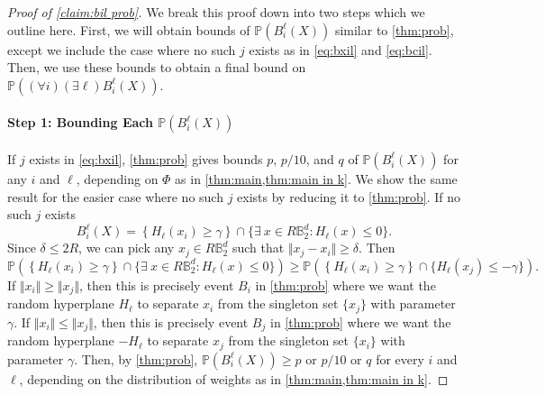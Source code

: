 \documentclass[aoap]{imsart}
\numberwithin{equation}{section}
\theoremstyle{definition}
\theoremstyle{remark}
\numberwithin{equation}{section}
\newcommand{\0}{\mathbf{0}}
\newcommand{\1}{\mathbf{1}}
\renewcommand{\P}{\mathbb{P}}
\newcommand{\B}{\mathbb{B}}
\numberwithin{equation}{section}
\begin{document}
\begin{proof}[Proof of \cref{claim:bil prob}]
We break this proof down into two steps which we outline here. First, we will obtain bounds of $\P(B_i^\ell(X))$ similar to \cref{thm:prob}, except we include the case where no such $j$ exists as in \eqref{eq:bxil} and \eqref{eq:bcil}. Then, we use these bounds to obtain a final bound on $\P\left((\forall i)(\exists \ell)B_{i}^{\ell}(X)\right)$. 

\paragraph{Step 1: Bounding Each $\P(B_i^\ell(X))$}
If $j$ exists in \eqref{eq:bxil}, \cref{thm:prob} gives bounds $p$, $p/10$, and $q$ of $\P(B_i^\ell(X))$ for any $i$ and $\ell$, depending on $\Phi$ as in \cref{thm:main,thm:main in k}. We show the same result for the easier case where no such $j$ exists by reducing it to \cref{thm:prob}. If no such $j$ exists
\[ B^{\ell}_{i}(X) =
\left\lbrace H_{\ell}(x_{i})\geq \gamma \right\rbrace \cap \lbrace\exists \ x\in R\B_2^d: H_\ell(x)\leq 0\rbrace. \]
Since $\delta\leq 2R$, we can pick any $x_j\in R\B_2^d$ such that $\Vert x_j-x_i\Vert \geq \delta$. Then
\[\P\left(\left\lbrace H_{\ell}(x_{i}) \geq \gamma \right\rbrace \cap \lbrace\exists  \ x\in R\B_2^d: H_\ell(x)\leq 0\rbrace\right)
\geq \P\left(\left\lbrace H_{\ell}(x_{i})\geq \gamma \right\rbrace \cap \lbrace H_\ell (x_j)\leq -\gamma\rbrace\right). \] 
If $\Vert x_i\Vert \geq \Vert x_j\Vert$, then this is precisely event $B_i$ in \cref{thm:prob} where we want the random hyperplane $H_\ell$ to separate $x_i$ from the singleton set $\lbrace x_j\rbrace$ with parameter $\gamma$. If $\Vert x_i\Vert \leq \Vert x_j\Vert$, then this is precisely event $B_j$ in \cref{thm:prob} where we want the random hyperplane $-H_\ell$ to separate $x_j$ from the singleton set $\lbrace x_i\rbrace$ with parameter $\gamma$. Then, by \cref{thm:prob}, $\P (B_{i}^{\ell}(X))\geq p$ or $p/10$ or $q$ for every $i$ and $\ell$, depending on the distribution of weights as in \cref{thm:main,thm:main in k}. 


\end{proof}
\end{document}
